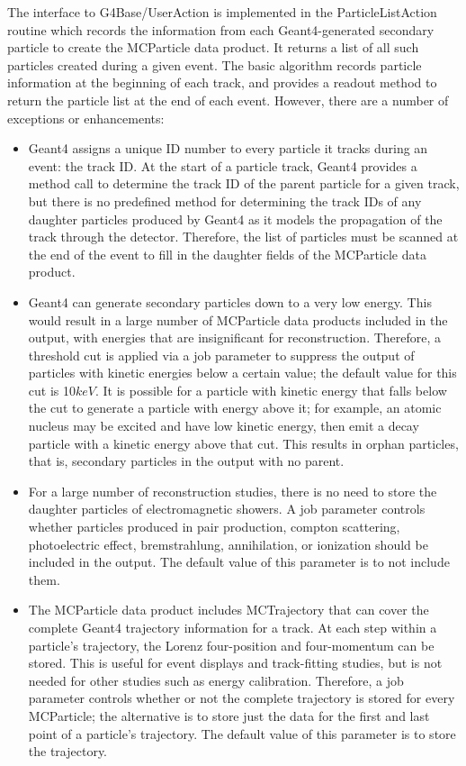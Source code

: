 \documentclass[12pt]{elsarticle}
\begin{document}
The interface to G4Base/UserAction is implemented in the ParticleListAction routine 
which records the
information from each Geant4-generated secondary particle to create
the MCParticle data product. It returns a list of all such particles
created during a given event.
The basic algorithm records particle
information at the beginning of each track, and provides a readout
method to return the particle list at the end of each event. However,
there are a number of exceptions or enhancements:

\begin{itemize}

\item Geant4 assigns a unique ID number to every particle it tracks
  during an event: the track ID. At the start of a particle track,
  Geant4 provides a method call to determine the track ID of the
  parent particle for a given track, but there is no predefined method
  for determining the track IDs of any daughter particles produced by
  Geant4 as it models the propagation of the track through the
  detector. Therefore, the list of particles must be scanned at the
  end of the event to fill in the daughter fields of the MCParticle
  data product.

\item Geant4 can generate secondary particles down to a very low
  energy. This would result in a large number of MCParticle data
  products included in the output, with energies that are
  insignificant for reconstruction. Therefore, a threshold cut is
  applied via a job parameter to suppress the output of particles with
  kinetic energies below a certain value; the default value for this
  cut is 10$keV$. It is possible for a particle with kinetic
  energy that falls below the cut to generate a particle with energy
  above it; for example, an atomic nucleus may be excited and have low
  kinetic energy, then emit a decay particle with a kinetic energy
  above that cut. This results in orphan particles, that is,
  secondary particles in the output with no parent. 

\item For a large number of reconstruction studies, there is no need
  to store the daughter particles of electromagnetic showers. A job
  parameter controls whether particles produced in pair production,
  compton scattering, photoelectric effect, bremstrahlung,
  annihilation, or ionization should be included in the output. The
  default value of this parameter is to not include them. 

\item The MCParticle data product includes MCTrajectory that can cover the complete Geant4 trajectory
  information for a track. At each step within a particle's
  trajectory, the Lorenz four-position and four-momentum can be
  stored. This is useful for event displays and track-fitting studies,
  but is not needed for other studies such as energy
  calibration. Therefore, a job parameter controls whether or not the
  complete trajectory is stored for every MCParticle; the
  alternative is to store just the data for the first and last point
  of a particle's trajectory. The default value of this parameter is
  to store the trajectory.


\end{itemize}
\end{document}
